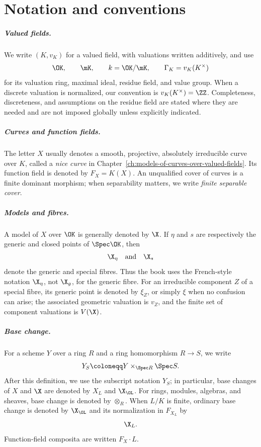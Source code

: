 \chapter*{Notation and conventions}

\paragraph*{Valued fields.}
We write $(K,v_K)$ for a valued field, with valuations written additively, and use
\[
    \OK, \qquad \mK, \qquad k=\OK/\mK, \qquad
    \Gamma_K=v_K(K^\times)
\]
for its valuation ring, maximal ideal, residue field, and value group.
When a discrete valuation is normalized, our convention is $v_K(K^\times)=\ZZ$.
Completeness, discreteness, and assumptions on the residue field are stated where they are needed and are not imposed globally unless explicitly indicated.

\paragraph*{Curves and function fields.}
The letter $X$ usually denotes a smooth, projective, absolutely irreducible curve over $K$, called a \emph{nice curve} in Chapter~\ref{ch:models-of-curves-over-valued-fields}.
Its function field is denoted by $F_X=K(X)$.
An unqualified cover of curves is a finite dominant morphism; when separability matters, we write \emph{finite separable cover}.

\paragraph*{Models and fibres.}
A model of $X$ over $\OK$ is generally denoted by $\X$.
If $\eta$ and $s$ are respectively the generic and closed points of $\Spec\OK$, then
\[
    \X_\eta \quad\text{and}\quad \X_s
\]
denote the generic and special fibres.
Thus the book uses the French-style notation $\X_\eta$, not $\X_g$, for the generic fibre. %
For an irreducible component $Z$ of a special fibre, its generic point is denoted by $\xi_Z$, or simply $\xi$ when no confusion can arise; the associated geometric valuation is $v_Z$, and the finite set of component valuations is $V(\X)$.

\paragraph*{Base change.}
For a scheme $Y$ over a ring $R$ and a ring homomorphism $R\to S$, we write
\[
    Y_S \coloneqq Y\times_{\Spec R}\Spec S.
\]
After this definition, we use the subscript notation $Y_S$; in particular, base changes of $X$ and $\X$ are denoted by $X_L$ and $\X_{\OL}$.
For rings, modules, algebras, and sheaves, base change is denoted by $\otimes_R$.
When $L/K$ is finite, ordinary base change is denoted by $\X_{\OL}$ and its normalization in $F_{X_L}$ by
\[
    \X_L.
\]
Function-field composita are written $F_X\mathbin{\cdot}L$.
